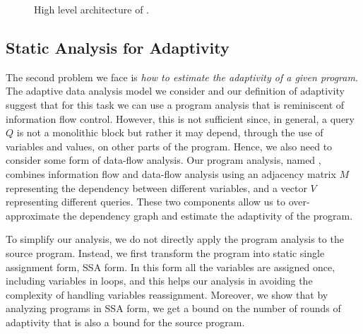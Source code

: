 \begin{figure}
    \centering    
   \caption{High level architecture of {\ADAPTSYSTEM}.}
    \label{fig:structure}
\end{figure}


\subsection{Static Analysis for Adaptivity}

The second problem we face is \emph{how to estimate the adaptivity of a given program}. The adaptive data analysis model we consider and our definition of adaptivity suggest that for this task we can use a  program analysis that is reminiscent of information flow control. However, this is not sufficient since, in general, a query $Q$ is not a monolithic block but rather it may depend, through the use of variables and values, on other parts of the program. Hence, we also need to consider some form of data-flow analysis. Our program analysis, named {\ADAPTSYSTEM}, combines information flow and data-flow analysis using an adjacency matrix $M$ representing the dependency between different variables, and a vector $V$ representing different queries. These two components allow us to over-approximate the dependency graph and estimate the adaptivity of the program. 

To simplify our analysis, we do not directly apply the program analysis to the source program. Instead, we first transform the program into static single assignment form, SSA form. In this form all the variables are assigned once, including variables in loops, and this helps our analysis in avoiding the complexity of handling variables reassignment. Moreover, we show that by analyzing programs in SSA form, we get a bound on the number of rounds of adaptivity that is also a bound for the source program.

